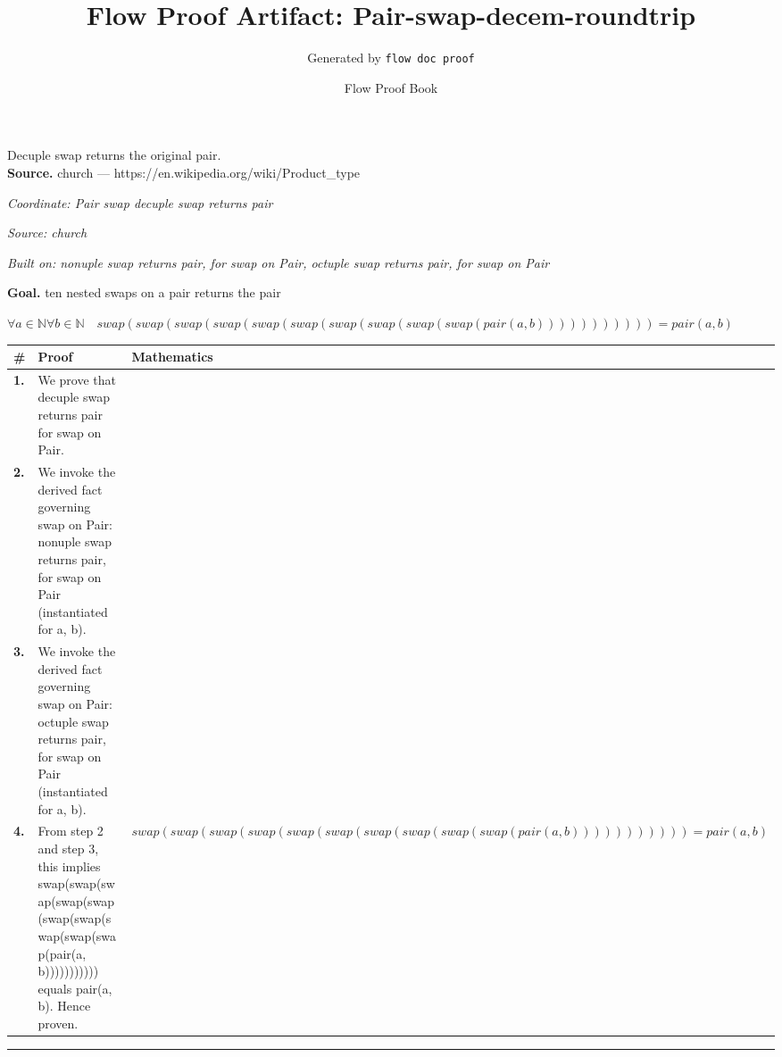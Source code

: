\documentclass[11pt]{article}
\title{Flow Proof Artifact: Pair-swap-decem-roundtrip}
\author{Generated by \texttt{flow doc proof}}
\date{Flow Proof Book}
\theoremstyle{definition}
\begin{document}
\maketitle
Decuple swap returns the original pair.\\[0.5em]
\textbf{Source.} church — https://en.wikipedia.org/wiki/Product\_type\\[0.5em]
\bigskip
{}\par
\smallskip\noindent\textit{Coordinate: Pair \cdot swap \cdot decuple swap returns pair}\par
\smallskip\noindent\textit{Source: church}\par
\smallskip\noindent\textit{Built on: nonuple swap returns pair, for swap on Pair, octuple swap returns pair, for swap on Pair}\par
\medskip
\noindent\textbf{Goal.} ten nested swaps on a pair returns the pair\par
\noindent$\displaystyle \forall a \in \mathbb{N} \forall b \in \mathbb{N}\quad swap(swap(swap(swap(swap(swap(swap(swap(swap(swap(pair(a, b))))))))))) = pair(a, b)$\par
\medskip
\noindent
\begin{tabular}{@{} >{\raggedright\arraybackslash}p{} >{\raggedright\arraybackslash}p{} >{\raggedleft\arraybackslash}p{} @{}}
\textbf{\#} & \textbf{Proof} & \textbf{Mathematics} \\
\midrule
\textbf{1.} & We prove that decuple swap returns pair for swap on Pair. & \\[0.45em]
\textbf{2.} & We invoke the derived fact governing swap on Pair: nonuple swap returns pair, for swap on Pair (instantiated for a, b). & \\[0.45em]
\textbf{3.} & We invoke the derived fact governing swap on Pair: octuple swap returns pair, for swap on Pair (instantiated for a, b). & \\[0.45em]
\textbf{4.} & From step 2 and step 3, this implies swap(swap(swap(swap(swap(swap(swap(swap(swap(swap(pair(a, b))))))))))) equals pair(a, b). Hence proven. & $\displaystyle swap(swap(swap(swap(swap(swap(swap(swap(swap(swap(pair(a, b))))))))))) = pair(a, b)$ \\[0.45em]
\bottomrule
\end{tabular}
\label{thm:Pair-swap-decuple_swap_returns_pair}
\par\medskip\hrule
\end{document}
